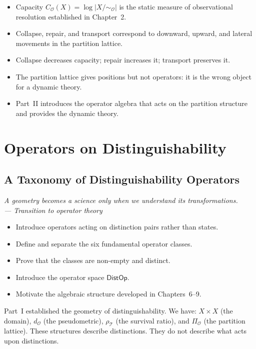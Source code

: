 \documentclass[12pt,twoside,openright]{book}
\newcommand{\transfam}{\mathcal{T}}       %
\newcommand{\distPairs}{X\times X}
\newcommand{\obs}{\mathcal{O}}
\newcommand{\survRatio}{\rho}             %
\newcommand{\distOp}{\mathsf{DistOp}}
\newcommand{\distMetric}{d_{\mathcal{O}}}
\newenvironment{epigraph}[2]{%
  \vspace{1em}\begin{flushright}
  \begin{minipage}{0.72\textwidth}
  \itshape\small #1\\[0.4em]
  \upshape\footnotesize\sffamily\color{DistGray}--- #2
  \end{minipage}\end{flushright}\vspace{1.5em}}{}
\newenvironment{objectives}{%
  \begin{tcolorbox}[colback=DistBlue!5,colframe=DistBlue,
    title={\faCheckCircle\enspace Chapter Objectives},
    fonttitle=\sffamily\bfseries\color{white},
    attach boxed title to top left={yshift=-2mm,xshift=4mm},
    boxed title style={colback=DistBlue},breakable]
  \begin{itemize}[leftmargin=*,nosep]}{%
  \end{itemize}\end{tcolorbox}\vspace{1em}}
\newenvironment{chapsummary}{%
  \begin{tcolorbox}[colback=DistBlue!5,colframe=DistBlue,
    title={\faBookOpen\enspace Summary},
    fonttitle=\sffamily\bfseries\color{white},
    attach boxed title to top left={yshift=-2mm,xshift=4mm},
    boxed title style={colback=DistBlue,rounded corners}]
  \begin{itemize}[nosep,leftmargin=*]}{%
  \end{itemize}\end{tcolorbox}}
\providecommand{\partitionObs}{\Pi_{\obs}}
\providecommand{\quotientObs}{X/{\sim_{\obs}}}
\providecommand{\capObs}[1]{C_{\obs}(#1)}
\begin{document}
\begin{chapsummary}
\item Capacity $\capObs{X}=\log|\quotientObs|$ is the static
  measure of observational resolution established in
  Chapter~2.
\item Collapse, repair, and transport correspond to downward,
  upward, and lateral movements in the partition lattice.
\item Collapse decreases capacity; repair increases it;
  transport preserves it.
\item The partition lattice gives positions but not operators:
  it is the wrong object for a dynamic theory.
\item Part~II introduces the operator algebra that acts on the
  partition structure and provides the dynamic theory.
\end{chapsummary}


\part{Operators on Distinguishability}
\chapter{A Taxonomy of Distinguishability Operators}
\label{ch:operator-taxonomy}

\begin{epigraph}{A geometry becomes a science only when we
  understand its transformations.}{Transition to operator
  theory}
\end{epigraph}

\begin{objectives}
\item Introduce operators acting on distinction pairs rather
  than states.
\item Define and separate the six fundamental operator classes.
\item Prove that the classes are non-empty and distinct.
\item Introduce the operator space $\distOp$.
\item Motivate the algebraic structure developed in
  Chapters~6--9.
\end{objectives}

Part~I established the geometry of distinguishability. We have:
$\distPairs$ (the domain), $\distMetric$ (the pseudometric),
$\survRatio_\transfam$ (the survival ratio), and $\partitionObs$
(the partition lattice). These structures describe distinctions.
They do not describe what acts upon distinctions.
\end{document}
